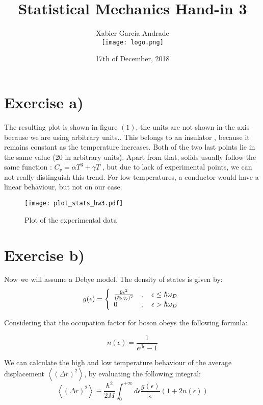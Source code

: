 \documentclass[a4paper,12pt]{article}
\title{Statistical Mechanics Hand-in 3}
\author{%
  Xabier García Andrade \\
 \texttt{[image: logo.png]}%
}
\date{17th of December, 2018}
\begin{document}
\maketitle

\newpage
\tableofcontents
\newpage
\section{Exercise a)}

The resulting plot is shown in figure $(1)$, the units are not shown in the axis because we are using arbitrary units.. This belongs to an insulator , because it remains constant as the temperature increases. Both of the two last points lie in the same value (20 in arbitrary units). Apart from that, solids usually follow the same function : $C_v = \alpha T^3 + \gamma T$ , but due to lack of experimental points, we can not really distinguish this trend. For low temperatures, a conductor would have a linear behaviour, but not on our case.


\begin{figure}[H]
\centering
\label{fig:heat}
\texttt{[image: plot\_stats\_hw3.pdf]}
\caption{Plot of the experimental data}
\end{figure}

\section{Exercise b)}

Now we will assume a Debye model. The density of states is given by:
\begin{equation}
g ( \epsilon ) = \left\{ \begin{array} { l l } { \frac { 9 \epsilon ^ { 2 } } { \left( \hbar \omega _ { D } \right) ^ { 3 } } } & { , \quad \epsilon \leq \hbar \omega _ { D } } \\ { 0 } & { , \quad \epsilon > \hbar \omega _ { D } } \end{array} \right.
\end{equation}

Considering that the occupation factor for boson obeys the following formula: 

\begin{equation}
n ( \epsilon ) = \frac { 1 } { e ^ { \beta \epsilon } - 1 }
\label{eq:occ}
\end{equation}

We can calculate the high and low temperature behaviour of the average displacement $\left\langle ( \Delta r ) ^ { 2 } \right\rangle$, by evaluating the following integral:
\begin{equation}
\left\langle ( \Delta r ) ^ { 2 } \right\rangle \equiv \frac { \hbar ^ { 2 } } { 2 M } \int _ { 0 } ^ { + \infty } d \epsilon \frac { g ( \epsilon ) } { \epsilon } ( 1 + 2 n ( \epsilon ) )
\label{eq:displa}
\end{equation}
\end{document}
